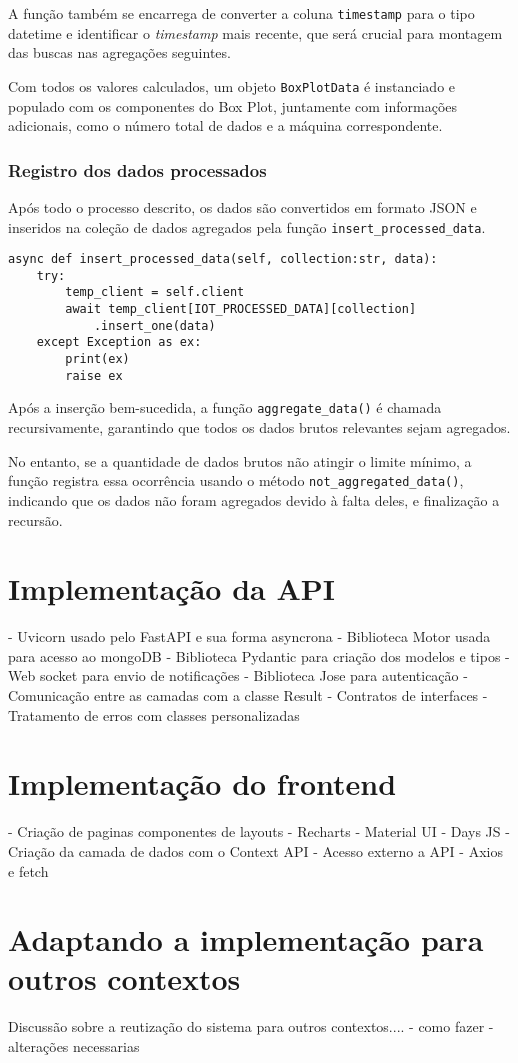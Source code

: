 A função também se encarrega de converter a coluna \texttt{timestamp} para o tipo datetime e identificar o \textit{timestamp} mais recente, que será crucial para montagem das buscas nas agregações seguintes.

Com todos os valores calculados, um objeto \texttt{BoxPlotData} é instanciado e populado com os componentes do Box Plot, juntamente com informações adicionais, como o número total de dados e a máquina correspondente.


\subsubsection{Registro dos dados processados}
Após todo o processo descrito, os dados são convertidos em formato JSON e inseridos na coleção de dados agregados pela função \texttt{insert\_processed\_data}.

\begin{verbatim}
async def insert_processed_data(self, collection:str, data):
    try:
        temp_client = self.client
        await temp_client[IOT_PROCESSED_DATA][collection]
            .insert_one(data)
    except Exception as ex:
        print(ex)
        raise ex
\end{verbatim}

Após a inserção bem-sucedida, a função \texttt{aggregate\_data()} é chamada recursivamente, garantindo que todos os dados brutos relevantes sejam agregados.

No entanto, se a quantidade de dados brutos não atingir o limite mínimo, a função registra essa ocorrência usando o método \texttt{not\_aggregated\_data()}, indicando que os dados não foram agregados devido à falta deles, e finalização a recursão.

\section[Implementação da API]{Implementação da API}
- Uvicorn usado pelo FastAPI e sua forma asyncrona
- Biblioteca Motor usada para acesso ao mongoDB
- Biblioteca Pydantic para criação dos modelos e tipos
- Web socket para envio de notificações
- Biblioteca Jose para autenticação
- Comunicação entre as camadas com a classe Result
- Contratos de interfaces
- Tratamento de erros com classes personalizadas


\section[Implementação do frontend]{Implementação do frontend}
- Criação de paginas componentes de layouts
- Recharts
- Material UI
- Days JS
- Criação da camada de dados com o Context API
- Acesso externo a API
- Axios e fetch

\section[Adaptando a implementação para outros contextos]{Adaptando a implementação para outros contextos}
Discussão sobre a reutização do sistema para outros contextos....
- como fazer
- alterações necessarias
